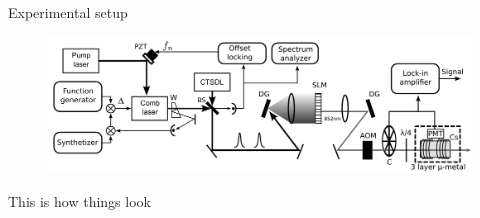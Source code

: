 \begin{block}{Experimental setup}
  \begin{figure}
    \begin{center}
      \includegraphics[width=.9\linewidth]{figures/experiment_big}
    \end{center}
    \label{Schematic of the experimental setup}
  \end{figure}
  This is how things look
\end{block}

